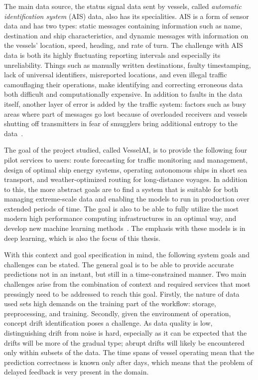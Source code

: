 The main data source, the status signal data sent by vessels, called \textit{automatic identification system} (AIS) data, also has its specialities. AIS is a form of sensor data and has two types: static messages containing information such as name, destination and ship characteristics, and dynamic messages with information on the vessels' location, speed, heading, and rate of turn. The challenge with AIS data is both its highly fluctuating reporting intervals and especially its unreliability.  Things such as manually written destinations, faulty timestamping, lack of universal identifiers, misreported locations, and even illegal traffic camouflaging their operations, make identifying and correcting erroneous data both difficult and computationally expensive. In addition to faults in the data itself, another layer of error is added by the traffic system: factors such as busy areas where part of messages go lost because of overloaded receivers and vessels shutting off transmitters in fear of smugglers bring additional entropy to the data~\cite{maritimeinformatics}.

The goal of the project studied, called VesselAI, is to provide the following four pilot services to users: route forecasting for traffic monitoring and management, design of optimal ship energy systems, operating autonomous ships in short sea transport, and weather-optimized routing for long-distance voyages. In addition to this, the more abstract goals are to find a system that is suitable for both managing extreme-scale data and enabling the models to run in production over extended periods of time. The goal is also to be able to fully utilize the most modern high performance computing infrastructures in an optimal way, and develop new machine learning methods~\cite{D1.1}. The emphasis with these models is in deep learning, which is also the focus of this thesis.

With this context and goal specification in mind, the following system goals and challenges can be stated. The general goal is to be able to provide accurate predictions not in an instant, but still in a time-constrained manner. Two main challenges arise from the combination of context and required services that most pressingly need to be addressed to reach this goal. Firstly, the nature of data used sets high demands on the training part of the workflow: storage, preprocessing, and training. Secondly, given the environment of operation, concept drift identification poses a challenge. As data quality is low, distinguishing drift from noise is hard, especially as it can be expected that the drifts will be more of the gradual type; abrupt drifts will likely be encountered only within subsets of the data. The time spans of vessel operating mean that the prediction correctness is known only after days, which means that the problem of delayed feedback is very present in the domain.

